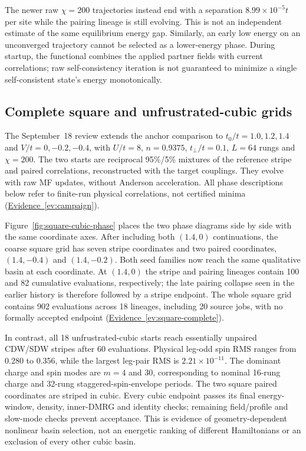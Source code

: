 \documentclass[11pt,letterpaper]{article}
\newcommand{\ev}[1]{\hyperref[ev:#1]{Evidence~\ref*{ev:#1}}}
\begin{document}
The newer raw $\chi=200$ trajectories instead end with a separation
$8.99\times10^{-5}t$ per site while the pairing lineage is still evolving.
This is not an independent estimate of the same equilibrium energy gap.
Similarly, an early low energy on an unconverged trajectory cannot be
selected as a lower-energy phase. During startup, the functional combines
the applied partner fields with current correlations; raw self-consistency
iteration is not guaranteed to minimize a single self-consistent state's
energy monotonically.

\subsection{Complete square and unfrustrated-cubic grids}
\label{sec:complete-grids}

The September~18 review extends the anchor comparison to
$t_0/t=1.0,1.2,1.4$ and $V/t=0,-0.2,-0.4$, with $U/t=8$,
$n=0.9375$, $t_\perp/t=0.1$, $L=64$ rungs and $\chi=200$.
The two starts are reciprocal 95\%/5\% mixtures of the reference stripe and
paired correlations, reconstructed with the target couplings. They evolve
with raw MF updates, without Anderson acceleration. All phase descriptions
below refer to finite-run physical correlations, not certified minima
(\ev{campaign}).

Figure~\ref{fig:square-cubic-phase} places the two phase diagrams side by
side with the same coordinate axes. After including both $(1.4,0)$
continuations, the coarse square grid has
seven stripe coordinates and two paired coordinates, $(1.4,-0.4)$ and
$(1.4,-0.2)$. Both seed families now reach the same qualitative basin at
each coordinate. At $(1.4,0)$ the stripe and pairing lineages contain
100 and 82 cumulative evaluations, respectively; the late pairing collapse
seen in the earlier history is therefore followed by a stripe endpoint.
The whole square grid contains 902 evaluations across 18 lineages, including
20 source jobs, with no formally accepted endpoint (\ev{square-complete}).

In contrast, all 18 unfrustrated-cubic starts reach essentially unpaired
CDW/SDW stripes after 60 evaluations. Physical leg-odd spin RMS ranges from
0.280 to 0.356, while the largest leg-pair RMS is $2.21\times10^{-11}$.
The dominant charge and spin modes are $m=4$ and 30, corresponding to
nominal 16-rung charge and 32-rung staggered-spin-envelope periods.
The two square paired coordinates are striped in cubic. Every cubic
endpoint passes its final energy-window, density, inner-DMRG and identity
checks; remaining field/profile and slow-mode checks prevent acceptance.
This is evidence of geometry-dependent nonlinear basin selection, not an
energetic ranking of different Hamiltonians or an exclusion of every other
cubic basin.
\end{document}
